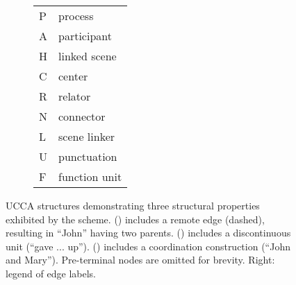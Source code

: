 \documentclass[11pt,a4paper]{article}
\begin{document}
\begin{figure}[t]
\begin{subfigure}{.9\columnwidth}
{\begin{adjustbox}{width=.3\columnwidth,margin=1pt,frame}
  \begin{tabular}{ll}
  P & process \\
  A & participant \\
  H & linked scene \\
  C & center \\
  R & relator \\
  N & connector \\
  L & scene linker \\
  U & punctuation \\
  F & function unit
  \end{tabular}
  \end{adjustbox}
  }
  \end{subfigure}
  \begin{subfigure}{.9\columnwidth}
  \vspace{-1cm}
  \parbox{.05\columnwidth}{\caption{}\label{fig:home}}
  \parbox{.65\columnwidth}{
  }
  \end{subfigure}
  \caption{\label{fig:examples}
    UCCA structures demonstrating three structural properties exhibited by
    the scheme.
    () includes a remote edge (dashed),
    resulting in ``John'' having two parents.
    () includes a discontinuous unit (``gave ... up'').
    () includes a coordination construction (``John and Mary'').
    Pre-terminal nodes are omitted for brevity.
    Right: legend of edge labels.
  }
\end{figure}
\end{document}
